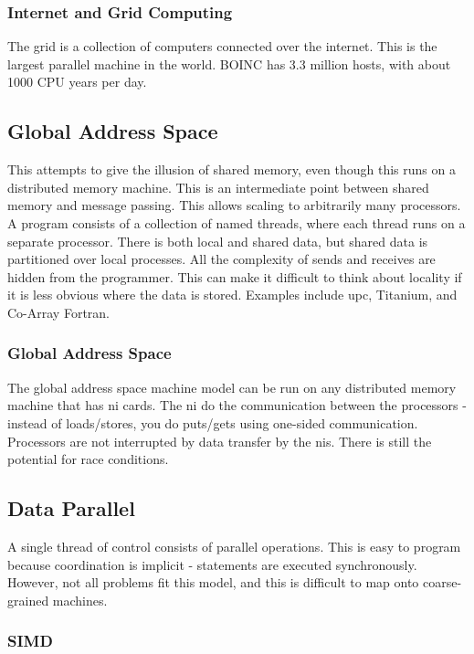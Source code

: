 \documentclass[10pt]{article}
\begin{document}
\begin{flushleft}
\subsubsection{Internet and Grid Computing}

The grid is a collection of computers connected over the internet. This is the largest parallel machine in the world. BOINC has 3.3 million hosts, with about 1000 CPU years per day. 

\subsection{Global Address Space}

This attempts to give the illusion of shared memory, even though this runs on a distributed memory machine. This is an intermediate point between shared memory and message passing. This allows scaling to arbitrarily many processors. A program consists of a collection of named threads, where each thread runs on a separate processor. There is both local and shared data, but shared data is partitioned over local processes. All the complexity of sends and receives are hidden from the programmer. This can make it difficult to think about locality if it is less obvious where the data is stored. Examples include \gls{upc}, Titanium, and Co-Array Fortran. 

\subsubsection{Global Address Space}

The global address space machine model can be run on any distributed memory machine that has \gls{ni} cards. The \gls{ni} do the communication between the processors - instead of loads/stores, you do puts/gets using one-sided communication. Processors are not interrupted by data transfer by the \gls{ni}s. There is still the potential for race conditions. 

\subsection{Data Parallel}

A single thread of control consists of parallel operations. This is easy to program because coordination is implicit - statements are executed synchronously. However, not all problems fit this model, and this is difficult to map onto coarse-grained machines.

\subsubsection{SIMD}


\end{flushleft}
\end{document}
